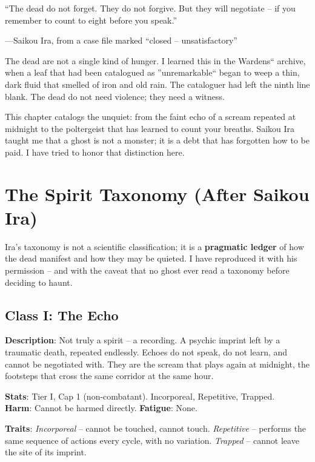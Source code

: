 
\epigraph{``The dead do not forget. They do not forgive. But they will negotiate -- if you remember to count to eight before you speak.''}{---Saikou Ira, from a case file marked ``closed -- unsatisfactory''}

The dead are not a single kind of hunger. I learned this in the Wardens`` archive, when a leaf that had been catalogued as ''unremarkable`` began to weep a thin, dark fluid that smelled of iron and old rain. The cataloguer had left the ninth line blank. The dead do not need violence; they need a witness.

This chapter catalogs the unquiet: from the faint echo of a scream repeated at midnight to the poltergeist that has learned to count your breaths. Saikou Ira taught me that a ghost is not a monster; it is a debt that has forgotten how to be paid. I have tried to honor that distinction here.

\section*{The Spirit Taxonomy (After Saikou Ira)}

Ira's taxonomy is not a scientific classification; it is a \textbf{pragmatic ledger} of how the dead manifest and how they may be quieted. I have reproduced it with his permission -- and with the caveat that no ghost ever read a taxonomy before deciding to haunt.

\subsection*{Class I: The Echo}

\noindent\textbf{Description}: Not truly a spirit -- a recording. A psychic imprint left by a traumatic death, repeated endlessly. Echoes do not speak, do not learn, and cannot be negotiated with. They are the scream that plays again at midnight, the footsteps that cross the same corridor at the same hour.

\noindent\textbf{Stats}: Tier I, Cap 1 (non-combatant). Incorporeal, Repetitive, Trapped.\\
\textbf{Harm}: Cannot be harmed directly. \textbf{Fatigue}: None.

\noindent\textbf{Traits}: 
\emph{Incorporeal} -- cannot be touched, cannot touch. \emph{Repetitive} -- performs the same sequence of actions every cycle, with no variation. \emph{Trapped} -- cannot leave the site of its imprint.

